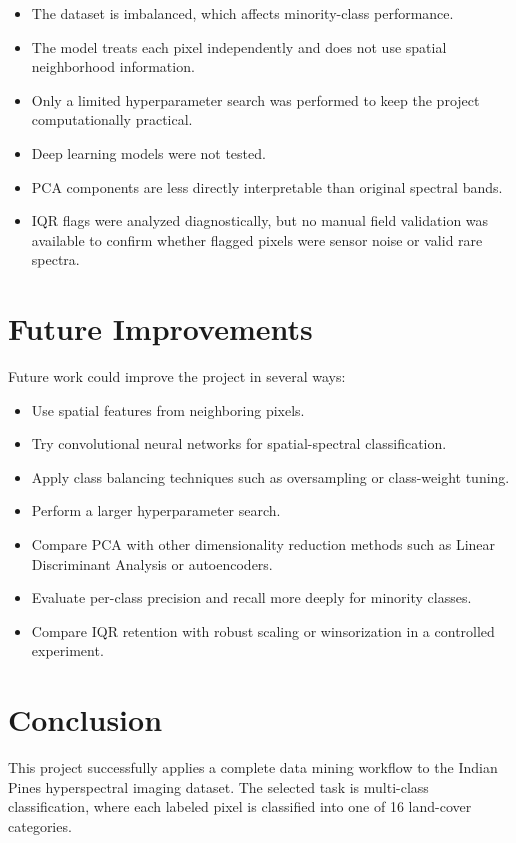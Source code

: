 \documentclass[12pt,a4paper]{article}
\begin{document}
\begin{itemize}
    \item The dataset is imbalanced, which affects minority-class performance.
    \item The model treats each pixel independently and does not use spatial neighborhood information.
    \item Only a limited hyperparameter search was performed to keep the project computationally practical.
    \item Deep learning models were not tested.
    \item PCA components are less directly interpretable than original spectral bands.
    \item IQR flags were analyzed diagnostically, but no manual field validation was available to confirm whether flagged pixels were sensor noise or valid rare spectra.
\end{itemize}

\section{Future Improvements}

Future work could improve the project in several ways:

\begin{itemize}
    \item Use spatial features from neighboring pixels.
    \item Try convolutional neural networks for spatial-spectral classification.
    \item Apply class balancing techniques such as oversampling or class-weight tuning.
    \item Perform a larger hyperparameter search.
    \item Compare PCA with other dimensionality reduction methods such as Linear Discriminant Analysis or autoencoders.
    \item Evaluate per-class precision and recall more deeply for minority classes.
    \item Compare IQR retention with robust scaling or winsorization in a controlled experiment.
\end{itemize}

\section{Conclusion}

This project successfully applies a complete data mining workflow to the Indian Pines hyperspectral imaging dataset. The selected task is multi-class classification, where each labeled pixel is classified into one of 16 land-cover categories.
\end{document}
